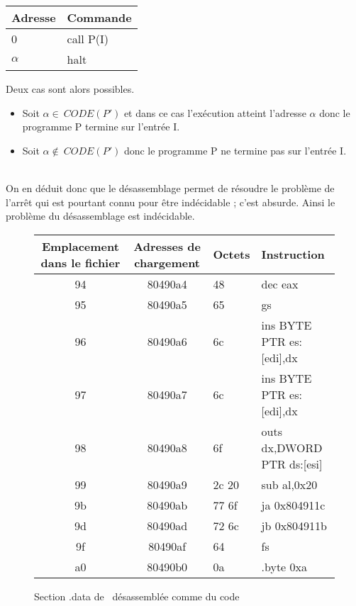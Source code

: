 \begin{center}
\begin{tabular}{|l|l|}
\hline
Adresse & Commande \\
\hline
0 & call P(I)\\
$\alpha$ & halt \\
\hline
\end{tabular}
\end{center}

Deux cas sont alors possibles.
\begin{itemize}
 \item Soit $\alpha\in\ CODE(P')$ et dans ce cas l'exécution atteint l'adresse $\alpha$ donc le programme P termine sur l'entrée I.
 \item Soit $\alpha\notin\ CODE(P')$ donc le programme P ne termine pas sur l'entrée I.
\end{itemize}
~\\
On en déduit donc que le désassemblage permet de résoudre le problème de l'arrêt qui est pourtant connu pour être indécidable ; c'est absurde.
Ainsi le problème du désassemblage est indécidable.


\begin{figure}
\begin{center}
\begin{tabular}{|c|c|l|l|}
\hline
Emplacement dans le fichier & Adresses de chargement & Octets & Instruction\\ 
\hline
94 & 80490a4 & 48    & dec    eax			\\
95 & 80490a5 & 65    & gs				\\
96 & 80490a6 & 6c    & ins    BYTE PTR es:[edi],dx	\\
97 & 80490a7 & 6c    & ins    BYTE PTR es:[edi],dx	\\
98 & 80490a8 & 6f    & outs   dx,DWORD PTR ds:[esi]	\\
99 & 80490a9 & 2c 20 & sub    al,0x20			\\
9b & 80490ab & 77 6f & ja     0x804911c			\\
9d & 80490ad & 72 6c & jb     0x804911b			\\
9f & 80490af & 64    & fs				\\
a0 & 80490b0 & 0a    & .byte 0xa			\\
\hline
\end{tabular}
\end{center}
\caption{Section .data de \helloworld\ désassemblée comme du code}
\label{fig:data_exec_helloworld}
\end{figure}

